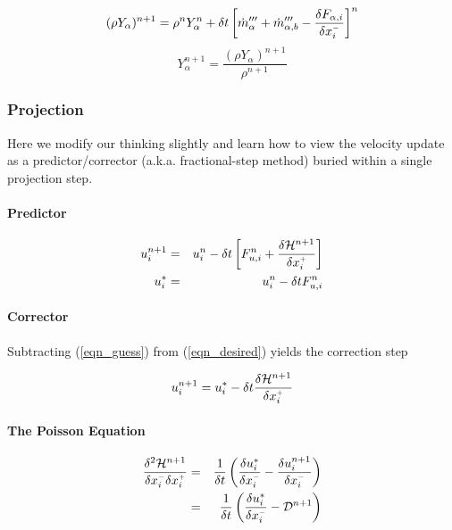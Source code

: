 \documentclass[11pt]{article}
\begin{document}
\begin{equation}
\label{eqn_densityupdate}
(\rho Y_\alpha)^{n+1} = \rho^n Y_\alpha^n + \delta t \left[\dot{m}_\alpha^{\prime\prime\prime} + \dot{m}_{\alpha,b}^{\prime\prime\prime} - \frac{\delta F_{\alpha,i}}{\delta x_i^{\scriptscriptstyle -}} \right]^n
\end{equation}
\begin{equation}
Y_\alpha^{n+1} = \frac{(\rho Y_\alpha)^{n+1}}{\rho^{n+1}}
\end{equation}

\subsubsection{Projection}

Here we modify our thinking slightly and learn how to view the velocity update as a predictor/corrector (a.k.a. fractional-step method) buried within a single projection step.

\paragraph{Predictor}

\begin{eqnarray}
\label{eqn_desired} u_i^{n+1} &=& u_i^n - \delta t \left[ F_{u,i}^n + \frac{\delta {\cal H}^{n+1}}{\delta x_i^{\scriptscriptstyle +}} \right] \\
\label{eqn_guess} u_i^* &=& u_i^n - \delta t F_{u,i}^n
\end{eqnarray}

\paragraph{Corrector} Subtracting (\ref{eqn_guess}) from (\ref{eqn_desired}) yields the correction step

\begin{equation}
u_i^{n+1} = u_i^* - \delta t \frac{\delta {\cal H}^{n+1}}{\delta x_i^{\scriptscriptstyle +}}
\end{equation}

\paragraph{The Poisson Equation}

\begin{eqnarray}
\label{eqn_poisson}
\frac{\delta^2 {\cal H}^{n+1}}{\delta x_i^{\scriptscriptstyle -}\delta x_i^{\scriptscriptstyle +}} &=& \frac{1}{\delta t}\left( \frac{\delta u_i^*}{\delta x_i^{\scriptscriptstyle -}} - \frac{\delta u_i^{n+1}}{\delta x_i^{\scriptscriptstyle -}} \right) \nonumber\\
&=& \frac{1}{\delta t}\left( \frac{\delta u_i^*}{\delta x_i^{\scriptscriptstyle -}} - {\cal D}^{n+1} \right)
\end{eqnarray}
\end{document}
